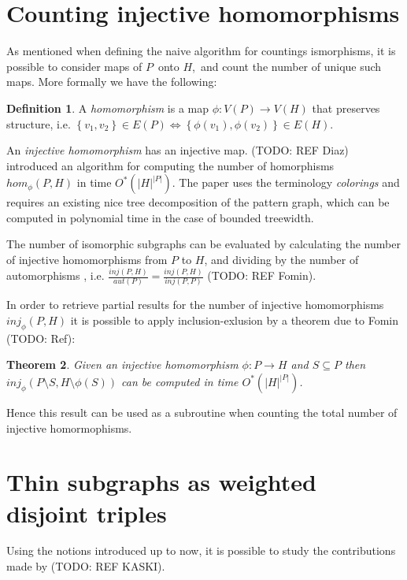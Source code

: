 \documentclass[a4paper,11pt,notitlepage]{report}
\theoremstyle{plain}
\newtheorem{thm}{Theorem}[chapter] %
\theoremstyle{definition}
\newtheorem{defn}[thm]{Definition} %
\begin{document}
\section{Counting injective homomorphisms}
As mentioned when defining the naive algorithm for countings ismorphisms, it is possible to consider maps of $P$ onto $H$, and count the number of unique such maps.
More formally we have the following:

\begin{defn}
A \emph{homomorphism} is a map $\phi : V(P) \rightarrow V(H)$ that preserves structure,
i.e. $\left\{v_1, v_2\right\} \in E(P) \Leftrightarrow \left\{\phi(v_1), \phi(v_2)\right\} \in E(H)$.
\end{defn}


An \emph{injective homomorphism} has an injective map.
(TODO: REF Diaz) introduced an algorithm for computing the number of homorphisms $hom_{\phi}(P, H)$ in time $O^*(|H|^|P|)$.
The paper uses the terminology \emph{colorings} and requires an existing nice tree decomposition of the pattern graph, which can be computed in polynomial time in the case of bounded treewidth.

The number of isomorphic subgraphs can be evaluated by calculating the number of injective homomorphisms from $P$ to $H$, and dividing by the number of automorphisms
, i.e. $\frac{inj(P, H)}{aut(P)} = \frac{inj(P, H)}{inj(P, P)}$ (TODO: REF Fomin).

In order to retrieve partial results for the number of injective homomorphisms $inj_{\phi}(P, H)$ it is possible to apply inclusion-exlusion by a theorem due to Fomin (TODO: Ref):

\begin{thm}
Given an injective homomorphism $\phi : P \rightarrow H$ and $S \subseteq P$ then $inj_{\phi}(P \setminus S, H \setminus \phi(S))$ can be computed in time $O^*(|H|^{|P|})$.
\end{thm}


Hence this result can be used as a subroutine when counting the total number of injective homormophisms.

\section{Thin subgraphs as weighted disjoint triples}
Using the notions introduced up to now, it is possible to study the contributions made by (TODO: REF KASKI).
\end{document}
